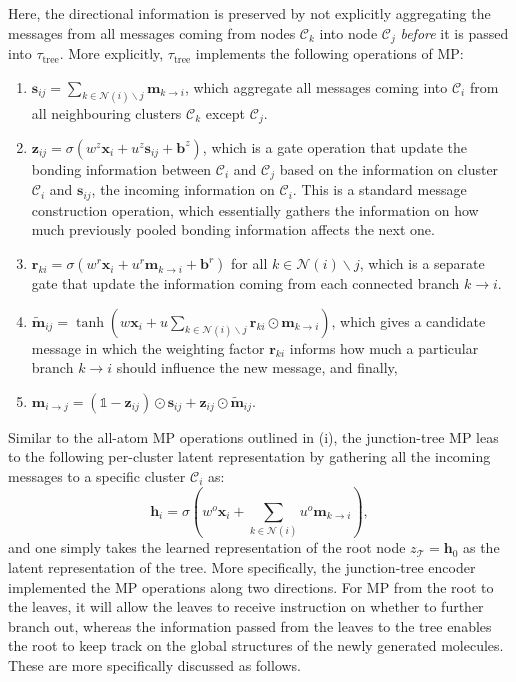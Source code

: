 \begin{myquote}
\hspace{10pt} Here, the directional information is preserved by not explicitly aggregating the messages from all messages coming from nodes $\mathcal{C}_{k}$ into node $\mathcal{C}_j$ \textit{before} it is passed into $\tau_{\mathrm{tree}}$. More explicitly,   $\tau_{\mathrm{tree}}$ implements the following operations of MP:
\begin{enumerate}
    \item $\bm{s}_{ij}=\sum_{k\in\mathcal{N}(i)\backslash j} \bm{m}_{k\to i}$, which aggregate all messages coming into $\mathcal{C}_i$ from all neighbouring clusters $\mathcal{C}_k$ except $\mathcal{C}_j$.
    \item $\bm{z}_{ij}=\sigma\left(w^{z} \bm{x}_i+u^z \bm{s}_{ij}+\bm{b}^{z}\right)$, which is a gate operation that update the bonding information between  $\mathcal{C}_i$ and $\mathcal{C}_j$ based on the information on cluster $\mathcal{C}_i$  and $\bm{s}_{ij}$, the incoming information on $\mathcal{C}_i$. This is a standard message construction operation, which essentially gathers the information on how much  previously pooled bonding information affects the next one.
    \item $\bm{r}_{ki}=\sigma\left(w^r \bm{x}_i + u^r \bm{m}_{k\to i} +\bm{b}^r \right)$ for all $k\in\mathcal{N}(i)\backslash j$, which is a separate gate that update the information coming from each connected branch $k\to i$.
    \item $\bm{\tilde{m}}_{ij}=\tanh\left(w\bm{x}_i+u\displaystyle{\sum_{k\in\mathcal{N}(i)\backslash j}} \bm{r}_{ki}\odot  \bm{m}_{k\to i}\right)$, which gives a candidate message in which the weighting factor $\bm{r}_{ki}$ informs how much a particular branch $k\to i$ should influence the new message, and finally,
    \item $\bm{m}_{i\to j}=(\mathds{1}-\bm{z}_{ij})\odot \bm{s}_{ij}+\bm{z}_{ij}\odot\bm{\tilde{m}}_{ij}$.
\end{enumerate}
Similar to the all-atom MP operations outlined in (i), the junction-tree MP leas to the following per-cluster latent representation by gathering all the incoming messages to a specific cluster $\mathcal{C}_i$ as:
\begin{equation*}
    \bm{h}_i=\sigma \left(w^{o}\bm{x}_i+ \sum_{k\in\mathcal{N}(i)} u^{o} \bm{m}_{k\to i} \right),
\end{equation*}
and one simply takes the learned representation of the root node $z_{\mathcal{T}}=\bm{h}_0$ as the latent representation of the tree. More specifically, the junction-tree encoder implemented the MP operations along two directions. For MP from the root to the leaves, it will allow the leaves to receive instruction on whether to further branch out, whereas the information passed from the leaves to the tree enables the root to keep track on the global structures of the newly generated molecules. These are more specifically discussed as follows.


\end{myquote}
